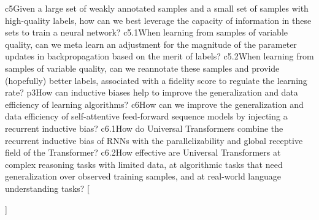 {{    %
    {c5}{Given a large set of weakly annotated samples and a small set of samples with high-quality labels, how can we best leverage the capacity of information in these sets to train a neural network?}%
    {c5.1}{When learning from samples of variable quality, can we meta learn an adjustment for the magnitude of the parameter updates in backpropagation based on the merit of labels?}
    {c5.2}{When learning from samples of variable quality, can we reannotate these samples and provide (hopefully) better labels, associated with a fidelity score to regulate the learning rate?}
    {p3}{How can inductive biases help to improve the generalization and data efficiency of learning algorithms?}
    {c6}{How can we improve the generalization and data efficiency of self-attentive feed-forward sequence models by injecting a recurrent inductive bias?}
    {c6.1}{How do Universal Transformers combine the recurrent inductive bias of RNNs with the parallelizability and global receptive field of the Transformer?}
    {c6.2}{How effective are Universal Transformers at complex reasoning tasks with limited data, at algorithmic tasks that need generalization over observed training samples, and at real-world language understanding tasks?}
    }[\PackageError{rq}{Undefined option to rq: #1}{}]%
}%

\newcommand{\resqname}[1]{%
    \IfEqCase{#1}{%
    {main}{RQ-Main}
    {p1}{RQ-1}
    {c2}{RQ-1.1}
    {c2.1}{RQ-1.1.1}
    {c2.2}{RQ-1.1.2}
    {c2.3}{RQ-1.1.3}
    {c3}{RQ-1.2}
    {c3.1}{RQ-1.2.1}
    {c3.2}{RQ-1.2.2}
    {c3.3}{RQ-1.2.3}
    {p2}{RQ-2}
    {c4}{RQ-2.1}%
    {c4.1}{RQ-2.1.1}
    {c4.2}{RQ-2.1.2}
    {c4.3}{RQ-2.1.3}
    {c5}{RQ-2.2}%
    {c5.1}{RQ-2.2.1}
    {c5.2}{RQ-2.2.2}
    {p3}{RQ-3}
    {c6}{RQ-3.1}%
    {c6.1}{RQ-3.1.1}
    {c6.2}{RQ-3.1.2}
    }[\PackageError{rq}{Undefined option to rq: #1}{}]%
}%

\newcommand{\resq}[1]{%
    \begin{resqbox}
        \begin{enumerate}
            \item[\textbf{\resqname{#1}}] \emph{\resqcontent{#1}}
        \end{enumerate}
    \end{resqbox}
}%